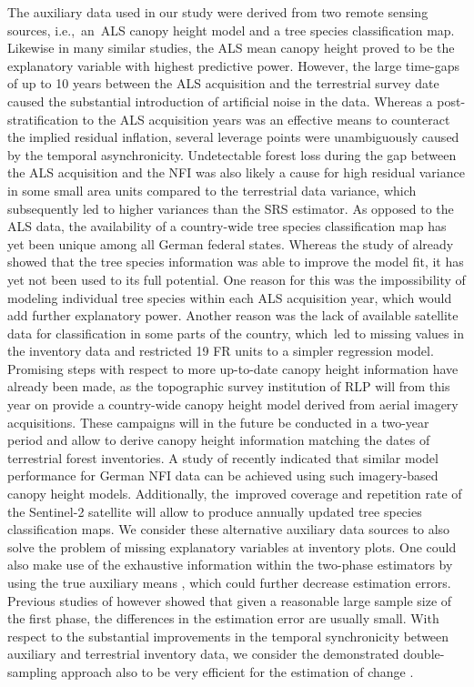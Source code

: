 \documentclass[remotesensing,article,accept,moreauthors,pdftex,10pt,a4paper]{Definitions/mdpi}
\begin{document}
The auxiliary data used in our study were derived from two remote sensing sources, i.e.,~an~ALS canopy height model and a tree species classification map. Likewise in many similar studies, the ALS mean canopy height proved to be the explanatory variable with highest predictive power. However, the large time-gaps of up to 10 years between the ALS acquisition and the terrestrial survey date caused the substantial introduction of artificial noise in the data. Whereas a post-stratification to the ALS acquisition years was an effective means to counteract the implied residual inflation, several leverage points were unambiguously caused by the temporal asynchronicity. Undetectable forest loss during the gap between the ALS acquisition and the NFI was also likely a cause for high residual variance in some small area units compared to the terrestrial data variance, which subsequently led to higher variances than the SRS estimator. As opposed to the ALS data, the availability of a country-wide tree species classification map has yet been unique among all German federal states. Whereas the study of \citet{hill2017a} already showed that the tree species information was able to improve the model fit, it has yet not been used to its full potential. One reason for this was the impossibility of modeling individual tree species within each ALS acquisition year, which would add further explanatory power. Another reason was the lack of available satellite data for classification in some parts of the country, which~led to missing values in the inventory data and restricted 19 FR units to a simpler regression model. Promising steps with respect to more up-to-date canopy height information have already been made, as the topographic survey institution of RLP will from this year on provide a country-wide canopy height model derived from aerial imagery acquisitions. These campaigns will in the future be conducted in a two-year period and allow to derive canopy height information matching the dates of terrestrial forest inventories. A study of \citet{kirchhoefer2017} recently indicated that similar model performance for German NFI data can be achieved using such imagery-based canopy height models. Additionally, the~improved coverage and repetition rate of the Sentinel-2 satellite \citep{sentinel2} will allow to produce annually updated tree species classification maps. We consider these alternative auxiliary data sources to also solve the problem of missing explanatory variables at inventory plots. One could also make use of the exhaustive information within the two-phase estimators by using the true auxiliary means \citep{mandallaz2013a, mandallaz2013b}, which could further decrease estimation errors. Previous studies of \citet{mandallaz2013b} however showed that given a reasonable large sample size of the first phase, the differences in the estimation error are usually small. With respect to the substantial improvements in the temporal synchronicity between auxiliary and terrestrial inventory data, we consider the demonstrated double-sampling approach also to be very efficient for the estimation of change \citep{massey2015b}.\par
\end{document}
